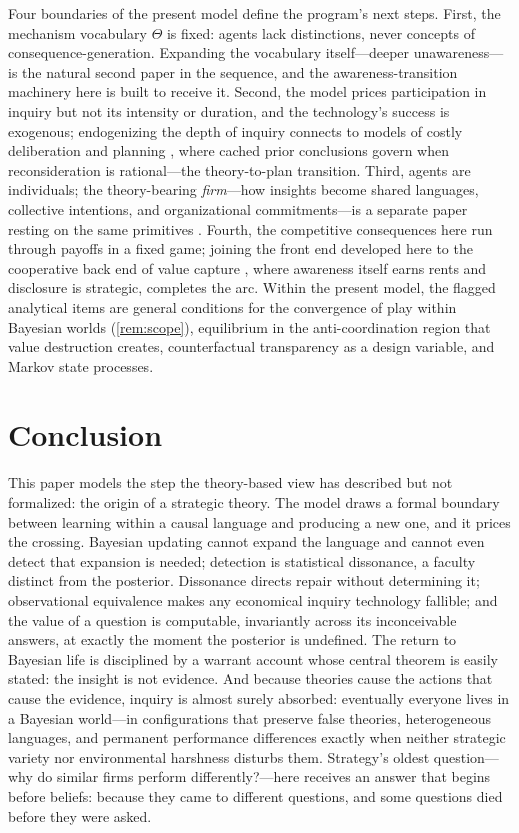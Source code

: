 \documentclass[11pt]{article}
\theoremstyle{definition}
\begin{document}
Four boundaries of the present model define the program's next steps.
First, the mechanism vocabulary $\Theta$ is fixed: agents lack distinctions,
never concepts of consequence-generation.  Expanding the vocabulary
itself---deeper unawareness---is the natural second paper in the sequence,
and the awareness-transition machinery here is built to receive it.  Second,
the model prices participation in inquiry but not its intensity or
duration, and the technology's success is exogenous; endogenizing the depth
of inquiry connects to models of costly deliberation and planning
\citep{RyallAction2026}, where cached prior conclusions govern when
reconsideration is rational---the theory-to-plan transition.  Third, agents
are individuals; the theory-bearing \emph{firm}---how insights become shared
languages, collective intentions, and organizational commitments---is a
separate paper resting on the same primitives \citep{RyallWilkins2018}.
Fourth, the competitive consequences here run through payoffs in a fixed
game; joining the front end developed here to the cooperative back end of
value capture \citep{GansRyall2017,BryanRyallSchipper2022}, where awareness
itself earns rents and disclosure is strategic, completes the arc.  Within
the present model, the flagged analytical items are general conditions for
the convergence of play within Bayesian worlds (\cref{rem:scope}),
equilibrium in the anti-coordination region that value destruction creates,
counterfactual transparency as a design variable, and Markov state
processes.

\section{Conclusion}
\label{sec:conclusion}

This paper models the step the theory-based view has described but not
formalized: the origin of a strategic theory.  The model draws a formal
boundary between learning within a causal language and producing a new one,
and it prices the crossing.  Bayesian updating cannot expand the language
and cannot even detect that expansion is needed; detection is statistical
dissonance, a faculty distinct from the posterior.  Dissonance directs
repair without determining it; observational equivalence makes any
economical inquiry technology fallible; and the value of a question is
computable, invariantly across its inconceivable answers, at exactly the
moment the posterior is undefined.  The return to Bayesian life is
disciplined by a warrant account whose central theorem is easily stated: the
insight is not evidence.  And because theories cause the actions that cause
the evidence, inquiry is almost surely absorbed: eventually everyone lives
in a Bayesian world---in configurations that preserve false theories,
heterogeneous languages, and permanent performance differences exactly when
neither strategic variety nor environmental harshness disturbs them.
Strategy's oldest question---why do similar firms perform differently?---here
receives an answer that begins before beliefs: because they came to
different questions, and some questions died before they were asked.
\end{document}
